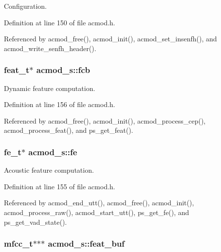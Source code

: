 Configuration. 



Definition at line 150 of file acmod.\-h.



Referenced by acmod\-\_\-free(), acmod\-\_\-init(), acmod\-\_\-set\-\_\-insenfh(), and acmod\-\_\-write\-\_\-senfh\-\_\-header().

\subsubsection[{fcb}]{\setlength{\rightskip}{0pt plus 5cm}feat\-\_\-t$\ast$ acmod\-\_\-s\-::fcb}\label{structacmod__s_a37ec6c2b1f3ada764842e08481239b34}


Dynamic feature computation. 



Definition at line 156 of file acmod.\-h.



Referenced by acmod\-\_\-free(), acmod\-\_\-init(), acmod\-\_\-process\-\_\-cep(), acmod\-\_\-process\-\_\-feat(), and ps\-\_\-get\-\_\-feat().

\subsubsection[{fe}]{\setlength{\rightskip}{0pt plus 5cm}fe\-\_\-t$\ast$ acmod\-\_\-s\-::fe}\label{structacmod__s_a56eaceb9b6a1cbcccd09cf42cfa87231}


Acoustic feature computation. 



Definition at line 155 of file acmod.\-h.



Referenced by acmod\-\_\-end\-\_\-utt(), acmod\-\_\-free(), acmod\-\_\-init(), acmod\-\_\-process\-\_\-raw(), acmod\-\_\-start\-\_\-utt(), ps\-\_\-get\-\_\-fe(), and ps\-\_\-get\-\_\-vad\-\_\-state().

\subsubsection[{feat\-\_\-buf}]{\setlength{\rightskip}{0pt plus 5cm}mfcc\-\_\-t$\ast$$\ast$$\ast$ acmod\-\_\-s\-::feat\-\_\-buf}\label{structacmod__s_afc52cc0151f6c7e32a230576141d20a3}


